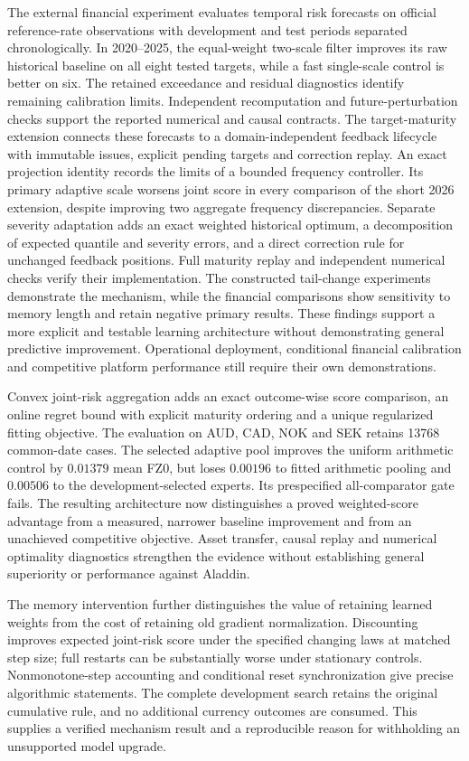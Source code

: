 \documentclass[11pt,a4paper]{article}
\theoremstyle{definition}\newtheorem{definition}[theorem]{Definition}
\begin{document}
The external financial experiment evaluates temporal risk forecasts on official reference-rate observations with development and test periods separated chronologically. In 2020--2025, the equal-weight two-scale filter improves its raw historical baseline on all eight tested targets, while a fast single-scale control is better on six. The retained exceedance and residual diagnostics identify remaining calibration limits. Independent recomputation and future-perturbation checks support the reported numerical and causal contracts. The target-maturity extension connects these forecasts to a domain-independent feedback lifecycle with immutable issues, explicit pending targets and correction replay. An exact projection identity records the limits of a bounded frequency controller. Its primary adaptive scale worsens joint score in every comparison of the short 2026 extension, despite improving two aggregate frequency discrepancies. Separate severity adaptation adds an exact weighted historical optimum, a decomposition of expected quantile and severity errors, and a direct correction rule for unchanged feedback positions. Full maturity replay and independent numerical checks verify their implementation. The constructed tail-change experiments demonstrate the mechanism, while the financial comparisons show sensitivity to memory length and retain negative primary results. These findings support a more explicit and testable learning architecture without demonstrating general predictive improvement. Operational deployment, conditional financial calibration and competitive platform performance still require their own demonstrations.


Convex joint-risk aggregation adds an exact outcome-wise score comparison, an online regret bound with explicit maturity ordering and a unique regularized fitting objective. The evaluation on AUD, CAD, NOK and SEK retains 13768 common-date cases. The selected adaptive pool improves the uniform arithmetic control by $0.01379$ mean FZ0, but loses $0.00196$ to fitted arithmetic pooling and $0.00506$ to the development-selected experts. Its prespecified all-comparator gate fails. The resulting architecture now distinguishes a proved weighted-score advantage from a measured, narrower baseline improvement and from an unachieved competitive objective. Asset transfer, causal replay and numerical optimality diagnostics strengthen the evidence without establishing general superiority or performance against Aladdin.


The memory intervention further distinguishes the value of retaining learned weights from the cost of retaining old gradient normalization. Discounting improves expected joint-risk score under the specified changing laws at matched step size; full restarts can be substantially worse under stationary controls. Nonmonotone-step accounting and conditional reset synchronization give precise algorithmic statements. The complete development search retains the original cumulative rule, and no additional currency outcomes are consumed. This supplies a verified mechanism result and a reproducible reason for withholding an unsupported model upgrade.
\end{document}
